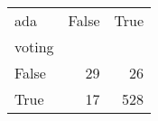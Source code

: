 \begin{tabular}{lrr}
\toprule
ada &  False &  True  \\
voting &        &        \\
\midrule
False  &     29 &     26 \\
True   &     17 &    528 \\
\bottomrule
\end{tabular}
